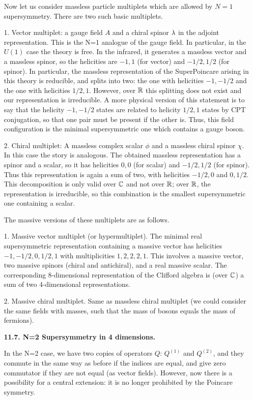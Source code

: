 Now let us consider massless particle multiplets which are allowed by
$N=1$ supersymmetry. There are two such basic multiplets.

1. Vector multiplet: a gauge field $A$ and a chiral spinor $\lambda$ in the adjoint
representation. This is the N=1 analogue of the gauge field.
In particular, in the $U(1)$ case the theory is free. In the infrared,
it generates a massless vector and a massless spinor, so the helicities are
$-1,1$ (for vector) and $-1/2,1/2$ (for spinor). In particular,
the massless representation of the SuperPoincare arising
in this theory is reducible, and splits into two:
the one with helicities $-1,-1/2$ and the one with helicities
$1/2,1$. However, over $\Bbb R$ this splitting does not exist and our
representation is irreducible.
A more physical version of this statement is to say that the
helicity $-1,-1/2$ states are related to helicity $1/2,1$ states by CPT
conjugation, so that one pair must be present if the other is.
Thus, this field configuration is the minimal
supersymmetric one which contains a gauge boson.

2. Chiral multiplet: A massless complex
scalar $\phi$ and a massless chiral spinor $\chi$. In this case the story
is analogous. The obtained massless representation
has a spinor and a scalar, so it has helicities
$0,0$ (for scalar) and $-1/2,1/2$ (for spinor). Thus this
representation is again a sum of two, with
helicities $-1/2,0$ and $0,1/2$. This decomposition is only
valid over $\Bbb C$ and not over $\Bbb R$; over $\Bbb R$, the representation
is irreducible, so this combination is the smallest supersymmetric one
containing a scalar.

The massive versions of these multiplets are as follows.

1. Massive vector multiplet (or hypermultiplet).
The minimal real supersymmetric representation containing a massive vector
has helicities $-1,-1/2,0,1/2,1$ with multiplicities
$1,2,2,2,1$. This involves a massive vector, two massive spinors
(chiral and antichiral), and a real massive scalar.
The corresponding 8-dimensional representation of the Clifford algebra
is (over $\Bbb C$) a sum of two 4-dimensional representations.

2. Massive chiral multiplet. Same as massless chiral multiplet (we could
consider the same fields with masses, such that the mass of bosons
equals the mass of fermions).

{\bf 11.7. N=2 Supersymmetry in 4 dimensions.}

In the N=2 case, we have two copies of operators $Q$:
$Q^{(1)}$ and $Q^{(2)}$,
and they commute in the same way as before if the indices
are equal, and give zero commutator if they are not equal
(as vector fields).
However, now there is a possibility for a central extension: it is
no longer prohibited by the Poincare symmetry.


